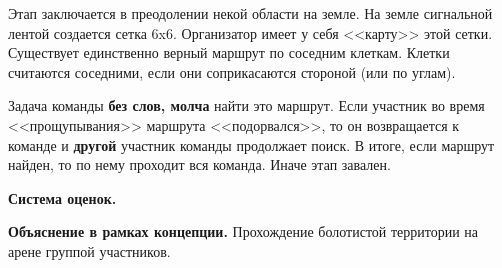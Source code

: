 
\par Этап заключается в преодолении некой области на земле. На земле сигнальной лентой создается сетка 6x6. Организатор имеет у себя <<карту>> этой сетки. Существует единственно верный маршрут по соседним клеткам. Клетки считаются соседними, если они соприкасаются стороной (или по углам).

\par Задача команды \textbf{без слов, молча} найти это маршрут. Если участник во время <<прощупывания>> маршрута <<подорвался>>, то он возвращается к команде и \textbf{другой} участник команды продолжает поиск. В итоге, если маршрут найден, то по нему проходит вся команда. Иначе этап завален.

\par \textbf{Система оценок.}

\par \textbf{Объяснение в рамках концепции.} Прохождение болотистой территории на арене группой участников.